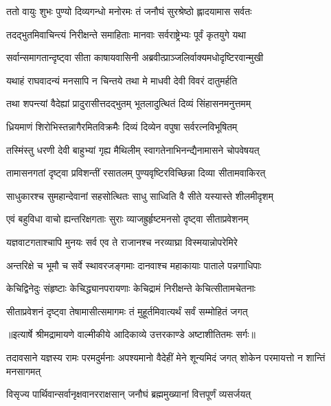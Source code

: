 \twolineshloka
{ततो वायुः शुभः पुण्यो दिव्यगन्धो मनोरमः}
{तं जनौघं सुरश्रेष्ठो ह्लादयामास सर्वतः} %

\twolineshloka
{तदद्भुतमिवाचिन्त्यं निरीक्षन्ते समाहिताः}
{मानवाः सर्वराष्ट्रेभ्यः पूर्वं कृतयुगे यथा} %

\twolineshloka
{सर्वान्समागतान्दृष्ट्वा सीता काषायवासिनी}
{अब्रवीत्प्राञ्जलिर्वाक्यमधोदृष्टिरवान्मुखी} %

\twolineshloka
{यथाहं राघवादन्यं मनसापि न चिन्तये}
{तथा मे माधवी देवी विवरं दातुमर्हति} %

\twolineshloka
{तथा शपन्त्यां वैदेह्यां प्रादुरासीत्तदद्भुतम्}
{भूतलादुत्थितं दिव्यं सिंहासनमनुत्तमम्} %

\twolineshloka
{ध्रियमाणं शिरोभिस्तन्नागैरमितविक्रमैः}
{दिव्यं दिव्येन वपुषा सर्वरत्नविभूषितम्} %

\twolineshloka
{तस्मिंस्तु धरणी देवी बाहुभ्यां गृह्य मैथिलीम्}
{स्वागतेनाभिनन्द्यैनामासने चोपवेषयत्} %

\twolineshloka
{तामासनगतां दृष्ट्वा प्रविशन्तीं रसातलम्}
{पुण्यवृष्टिरविच्छिन्ना दिव्या सीतामवाकिरत्} %

\twolineshloka
{साधुकारश्च सुमहान्देवानां सहसोत्थितः}
{साधु साध्विति वै सीते यस्यास्ते शीलमीदृशम्} %

\twolineshloka
{एवं बहुविधा वाचो ह्यन्तरिक्षगताः सुराः}
{व्याजह्रुर्हृष्टमनसो दृष्ट्वा सीताप्रवेशनम्} %

\twolineshloka
{यज्ञवाटगताश्चापि मुनयः सर्व एव ते}
{राजानश्च नरव्याघ्रा विस्मयान्नोपरेमिरे} %

\twolineshloka
{अन्तरिक्षे च भूमौ च सर्वे स्थावरजङ्गमाः}
{दानवाश्च महाकायाः पाताले पन्नगाधिपाः} %

\twolineshloka
{केचिद्विनेदुः संहृष्टाः केचिद्ध्यानपरायणाः}
{केचिद्रामं निरीक्षन्ते केचित्सीतामचेतनाः} %

\twolineshloka
{सीताप्रवेशनं दृष्ट्वा तेषामासीत्समागमः}
{तं मुहूर्तमिवात्यर्थं सर्वं सम्मोहितं जगत्} %


{॥इत्यार्षे श्रीमद्रामायणे वाल्मीकीये आदिकाव्ये उत्तरकाण्डे अष्टाशीतितमः सर्गः॥}


\threelineshloka
{तदावसाने यज्ञस्य रामः परमदुर्मनाः}
{अपश्यमानो वैदेहीं मेने शून्यमिदं जगत्}
{शोकेन परमायत्तो न शान्तिं मनसागमत्} %

\twolineshloka
{विसृज्य पार्थिवान्सर्वानृक्षवानरराक्षसान्}
{जनौघं ब्रह्ममुख्यानां वित्तपूर्णं व्यसर्जयत्} %

